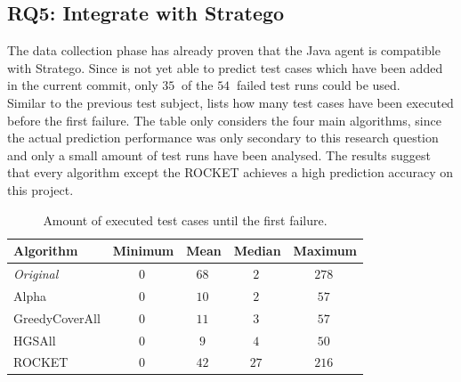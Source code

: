 \clearpage

\subsection{RQ5: Integrate \velocity{} with Stratego}
The data collection phase has already proven that the Java agent is compatible with Stratego. Since \velocity{} is not yet able to predict test cases which have been added in the current commit, only $\SI{35}{}$ of the $\SI{54}{}$ failed test runs could be used.\\

\noindent Similar to the previous test subject,  lists how many test cases have been executed before the first failure. The table only considers the four main algorithms, since the actual prediction performance was only secondary to this research question and only a small amount of test runs have been analysed. The results suggest that every algorithm except the ROCKET achieves a high prediction accuracy on this project.

\begin{table}[h]
	\centering
	\begin{tabularx}{\textwidth}{|X||c|c|c|c|}
		\hline
		\textbf{Algorithm} & \textbf{Minimum} & \textbf{Mean} & \textbf{Median} & \textbf{Maximum}\\
		
		\hline
		
		\emph{Original} & $\SI{0}{}$ & $\SI{68}{}$ & $\SI{2}{}$ & $\SI{278}{}$\\
		
		\hline
		
		Alpha & $\SI{0}{}$ & $\SI{10}{}$ & $\SI{2}{}$ & $\SI{57}{}$\\
		
		\hline
		
		GreedyCoverAll & $\SI{0}{}$ & $\SI{11}{}$ & $\SI{3}{}$ & $\SI{57}{}$\\
		
		\hline
		
		HGSAll & $\SI{0}{}$ & $\SI{9}{}$ & $\SI{4}{}$ & $\SI{50}{}$\\
		
		\hline
		
		ROCKET & $\SI{0}{}$ & $\SI{42}{}$ & $\SI{27}{}$ & $\SI{216}{}$\\
		
		\hline
	\end{tabularx}
	\caption{Amount of executed test cases until the first failure.}
	\label{tbl:rq5-first-failure}
\end{table}


